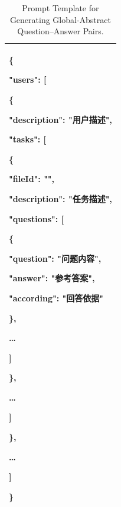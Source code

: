 \begin{table}[!htbp]
\begin{tabular}{p{}}
\begin{minipage}[t]{0.92\textwidth}
\ttfamily
\{\par
\hspace*{1em}"users": [\par
\hspace*{2em}\{\par
\hspace*{3em}"description": "\normalfont 用户描述\ttfamily",\par
\hspace*{3em}"tasks": [\par
\hspace*{4em}\{\par
\hspace*{5em}"fileId": "",\par
\hspace*{5em}"description": "\normalfont 任务描述\ttfamily",\par
\hspace*{5em}"questions": [\par
\hspace*{6em}\{\par
\hspace*{7em}"question": "\normalfont 问题内容\ttfamily",\par
\hspace*{7em}"answer": "\normalfont 参考答案\ttfamily",\par
\hspace*{7em}"according": "\normalfont 回答依据\ttfamily"\par
\hspace*{6em}\},\par
\hspace*{6em}\ldots\par
\hspace*{5em}]\par
\hspace*{4em}\},\par
\hspace*{4em}\ldots\par
\hspace*{3em}]\par
\hspace*{2em}\},\par
\hspace*{2em}\ldots\par
\hspace*{1em}]\par
\}\par
\normalfont

\end{minipage}

\\
\bottomrule
\end{tabular}

\caption{Prompt Template for Generating Global-Abstract Question--Answer Pairs.}
\label{tab:global-abstract-prompt}

\end{table}